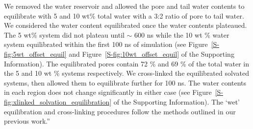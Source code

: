 \documentclass{article}
\begin{document}
\begin{enumerate}
    We removed the water reservoir and allowed the pore and tail water
    contents to equilibrate with 5 and 10 wt\% total water with a 3:2 ratio
    of pore to tail water. We considered the water content
    equilibrated once the water contents plateaued. The 5 wt\% system did
    not plateau until $\sim$ 600 ns 
    while the 10 wt \% water system equilibrated within the first 100 ns of 
    simulation (see Figure~\ref{S-fig:5wt_offset_equil} and Figure~\ref{S-fig:10wt_offset_equil} of
    the Supporting Information). The equilibrated pores contain 72 \% and 69 \% of the total water in the
    5 and 10 wt \% systems respectively. We cross-linked the equilibrated 
    solvated systems, then allowed them to equilibrate further for 100 ns. 
    The water contents in each region does not change significantly in either case 
    (see Figure~\ref{S-fig:xlinked_solvation_equilibration} of the Supporting Information).
    The `wet' equilibration and cross-linking procedures follow
    the methods outlined in our previous work.''

\end{enumerate}



\end{document}
